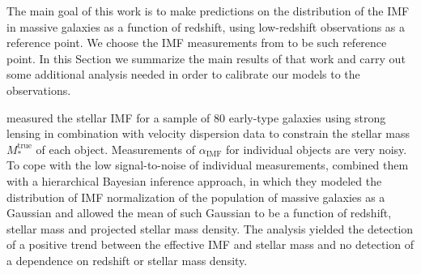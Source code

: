 \documentclass[usenatbib, letters]{mnras}
\def\mtrue{M_*^{\mathrm{true}}}
\def\aimf{\alpha_{\mathrm{IMF}}}
\begin{document}
The main goal of this work is to make predictions on the distribution of the IMF in massive galaxies as a function of redshift, using low-redshift observations as a reference point.
We choose the IMF measurements from \citep{Son++15} to be such reference point.
In this Section we summarize the main results of that work and carry out some additional analysis needed in order to calibrate our models to the observations.

\citet{Son++15} measured the stellar IMF for a sample of 80 early-type galaxies using strong lensing in combination with velocity dispersion data to constrain the stellar mass $\mtrue$ of each object.
Measurements of $\aimf$ for individual objects are very noisy. To cope with the low signal-to-noise of individual measurements, \citet{Son++15} combined them with a hierarchical Bayesian inference approach, in which they modeled the distribution of IMF normalization of the population of massive galaxies as a Gaussian and allowed the mean of such Gaussian to be a function of redshift, stellar mass and projected stellar mass density.
The analysis yielded the detection of a positive trend between the effective IMF and stellar mass and no detection of a dependence on redshift or stellar mass density.
\end{document}
